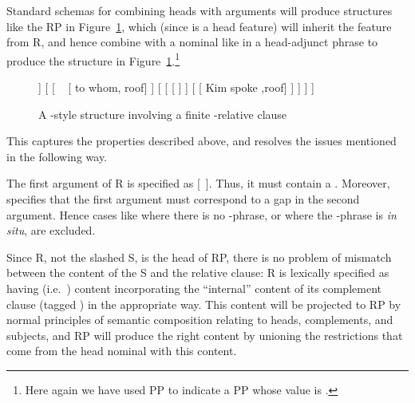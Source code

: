 \documentclass[output=paper
                ,modfonts
                ,nonflat
	        ,collection
	        ,collectionchapter
	        ,collectiontoclongg
 	        ,biblatex
                ,babelshorthands
                ,newtxmath
                ,draftmode
                ,colorlinks, citecolor=brown
]{./langsci/langscibook}
\begin{document}
Standard schemas for combining heads with arguments will produce structures like the RP in
Figure~\ref{fig:rc-3}, which (since  is a head feature) will inherit the
 feature from R, and hence combine with a nominal like  in a
head-adjunct phrase to produce the structure in Figure~\ref{fig:rc-3}.\footnote{Here again
  we have used PP  to indicate a PP whose  value is .}
\begin{figure}
  \begin{forest} %
   [{\ibar{N}\subtag{1}}%
      [{\idx{7} \ibar{N}\subtag{1}}  [ {person} ]  
      ]  
      [{} 
         [{}  ~
            [ {to whom}, roof] 
         ]
         [{}
            [{}     [ {\trace} ] ]
            [{}  [ {Kim spoke} ,roof] ]
         ]
      ]
   ]
   \end{forest}
   \caption{A \cite{Pollard:Sag:94}-style structure involving a finite -relative clause}
   \label{fig:rc-3}
\end{figure}

This captures the properties described above, and resolves the issues mentioned in the
following way.

The first argument of R is specified as [~]. Thus, it must contain
a . Moreover,  specifies that the first argument must
correspond to a gap in the second argument. Hence cases like  where there is no
-phrase, or where the -phrase is \emph{in situ}, are excluded.

Since R, not the slashed S, is the head of RP, there is no problem of mismatch between the
content of the S and the relative clause: R is lexically specified as having 
(i.e.\ ) content incorporating the ``internal'' content of its complement clause
(tagged ) in the appropriate way. This  content will be
projected to RP by normal principles of semantic composition relating to heads,
complements, and subjects, and RP will produce the right content by unioning the
restrictions that come from the head nominal with this  content.
\end{document}

